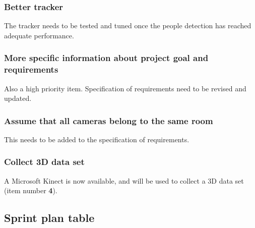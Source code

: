 \subsubsection{Better tracker}
The tracker needs to be tested and tuned once the people detection has reached adequate performance.

\subsubsection{More specific information about project goal and requirements}
Also a high priority item. Specification of requirements need to be revised and updated.

\subsubsection{Assume that all cameras belong to the same room}
This needs to be added to the specification of requirements.

\subsubsection{Collect 3D data set}
A Microsoft Kinect is now available, and will be used to collect a 3D data set (item number \textbf{4}).



\subsection{Sprint plan table}

